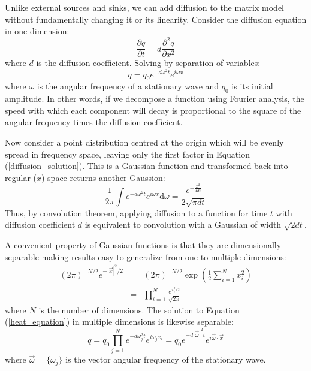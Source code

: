 \documentclass[11pt]{article}
\begin{document}
Unlike external sources and sinks, we can add diffusion to the matrix model 
without fundamentally changing it or its linearity. 
Consider the diffusion equation in one dimension:
\begin{equation}
  \frac{\partial q}{\partial t}=d \frac{\partial^2 q}{\partial x^2}
  \label{heat_equation}
\end{equation}
where $d$ is the diffusion coefficient.
Solving by separation of variables:
\begin{equation}
  q=q_0 e^{-d \omega^2 t} e^{i \omega x}
  \label{diffusion_solution}
\end{equation}
where $\omega$ is the angular frequency of a stationary wave
and $q_0$ is its initial amplitude.
In other words, if we decompose a function using Fourier analysis, the speed
with which each component will decay is proportional to the square of the
angular frequency times the diffusion coefficient.

Now consider a point distribution centred at the origin 
which will be evenly spread
in frequency space, leaving only the first factor in 
Equation (\ref{diffusion_solution}). 
This is a Gaussian function and transformed
back into regular ($x$) space returns another Gaussion:
\begin{equation}
	\frac{1}{2 \pi} \int e^{-d \omega^2 t} e^{i \omega x} \mathrm d \omega = \frac{e^{-\frac{x^2}{4 d t}}}{2 \sqrt{\pi d t}}
	\label{Gaussian_diffusion}
\end{equation}
Thus, by convolution theorem, 
applying diffusion to a function for time $t$ 
with diffusion coefficient $d$ 
is equivalent to convolution with a Gaussian of width $\sqrt{2 d t}$.

A convenient property of Gaussian functions 
is that they are dimensionally separable
making results easy to generalize from one to multiple dimensions:
\begin{eqnarray}
	\left (2 \pi \right )^{-N/2} e^{-| \vec x |^2/2} 
	& = & \left ( 2 \pi \right )^{-N/2} \exp \left ( \frac{1}{2} \sum_{i=1}^N x_i^2 \right ) \\
	& = & \prod_{i=1}^N \frac{e^{x_i^2/2}}{\sqrt{2 \pi}}
\end{eqnarray}
where $N$ is the number of dimensions.
The solution to Equation (\ref{heat_equation}) in multiple dimensions is likewise
separable:
\begin{equation}
	q=q_0 \prod_{j=1}^N e^{-d \omega_j^2 t} e^{i \omega_j x_i} = q_0 e^{-d|\vec \omega|^2 t} e^{i \vec \omega \cdot \vec x}
\end{equation}
where $\vec \omega=\lbrace \omega_j \rbrace$ is the vector angular frequency
of the stationary wave.
\end{document}
